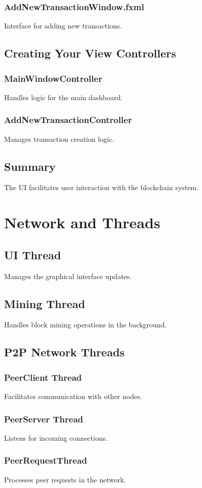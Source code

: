 \documentclass[12pt,a4paper]{report}
\begin{document}
\subsection{AddNewTransactionWindow.fxml}
Interface for adding new transactions.
\section{Creating Your View Controllers}
\subsection{MainWindowController}
Handles logic for the main dashboard.
\subsection{AddNewTransactionController}
Manages transaction creation logic.
\section{Summary}
The UI facilitates user interaction with the blockchain system.

\chapter{Network and Threads}
\section{UI Thread}
Manages the graphical interface updates.
\section{Mining Thread}
Handles block mining operations in the background.
\section{P2P Network Threads}
\subsection{PeerClient Thread}
Facilitates communication with other nodes.
\subsection{PeerServer Thread}
Listens for incoming connections.
\subsection{PeerRequestThread}
Processes peer requests in the network.
\end{document}
